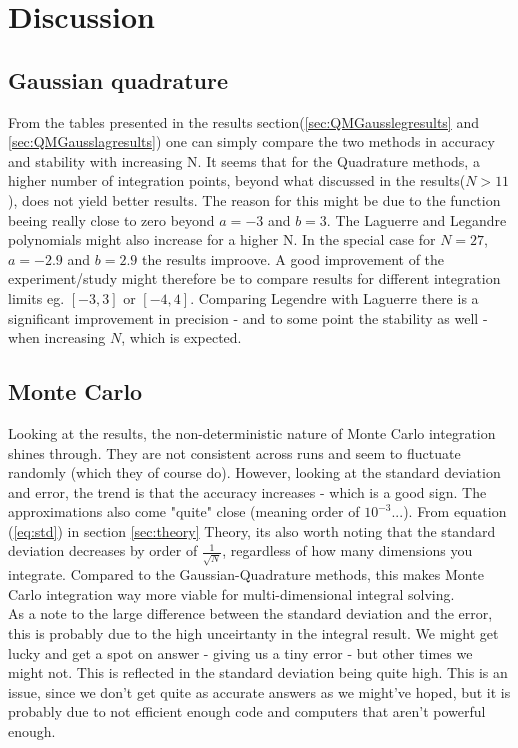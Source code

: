 \documentclass[../main.tex]{subfiles}
\begin{document}
\section{Discussion}
\subsection{Gaussian quadrature}
From the tables presented in the results section(\ref{sec:QMGausslegresults} and \ref{sec:QMGausslagresults}) one can simply compare the two methods in accuracy and stability with increasing N. It seems that for the Quadrature methods, a higher number of integration points, beyond what discussed in the results($N>11$), does not yield better results. The reason for this might be due to the function beeing really close to zero beyond $a=-3$ and $b = 3$. The Laguerre and Legandre polynomials might also increase for a higher N. In the special case for $N = 27$, $a = -2.9$ and $b = 2.9$ the results improove. A good improvement of the experiment/study might therefore be to compare results for different integration limits eg. $[-3,3]$ or $[-4,4]$.
Comparing Legendre with Laguerre there is a significant improvement in precision - and to some point the stability as well - when increasing $N$, which is expected.

\subsection{Monte Carlo}
Looking at the results, the non-deterministic nature of Monte Carlo integration shines through. They are not consistent across runs and seem to fluctuate randomly (which they of course do). However, looking at the standard deviation and error, the trend is that the accuracy increases - which is a good sign. The approximations also come "quite" close (meaning order of $10^{-3}$...). From equation (\ref{eq:std}) in section \ref{sec:theory} Theory, its also worth noting that the standard deviation decreases by order of $\frac{1}{\sqrt{N}}$, regardless of how many dimensions you integrate. Compared to the Gaussian-Quadrature methods, this makes Monte Carlo integration way more viable for multi-dimensional integral solving. \\

As a note to the large difference between the standard deviation and the error, this is probably due to the high unceirtanty in the integral result. We might get lucky and get a spot on answer - giving us a tiny error - but other times we might not. This is reflected in the standard deviation being quite high. This is an issue, since we don't get quite as accurate answers as we might've hoped, but it is probably due to not efficient enough code and computers that aren't powerful enough.
\end{document}
